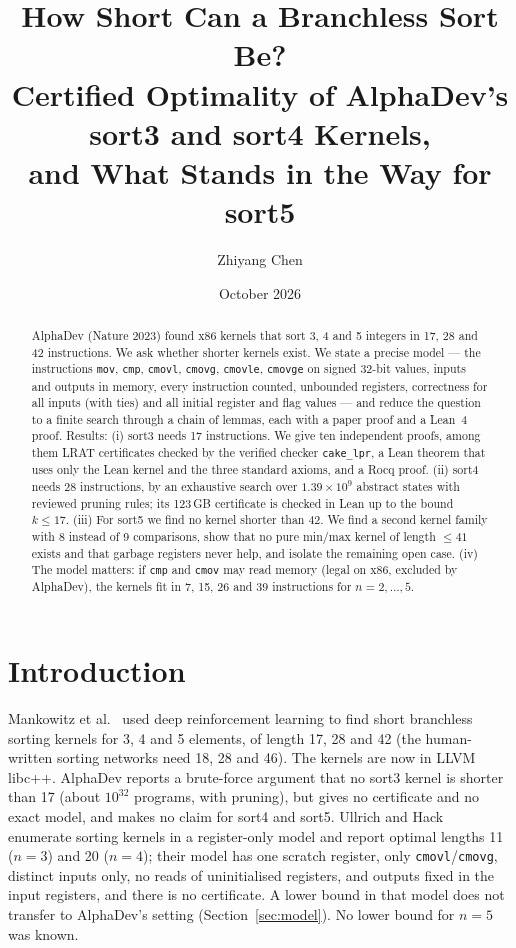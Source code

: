\documentclass[11pt]{article}
\title{How Short Can a Branchless Sort Be?\\ Certified Optimality of AlphaDev's sort3 and sort4 Kernels,\\ and What Stands
in the Way for sort5}
\author{Zhiyang Chen}
\date{October 2026}
\theoremstyle{remark}\newtheorem{remark}[theorem]{Remark}
\begin{document}
\maketitle

\begin{abstract}
AlphaDev (Nature 2023) found x86 kernels that sort 3, 4 and 5 integers in 17, 28 and 42 instructions. We ask whether
shorter kernels exist. We state a precise model --- the instructions \texttt{mov}, \texttt{cmp}, \texttt{cmovl},
\texttt{cmovg}, \texttt{cmovle}, \texttt{cmovge} on signed 32-bit values, inputs and outputs in memory, every instruction
counted, unbounded registers, correctness for all inputs (with ties) and all initial register and flag values --- and reduce
the question to a finite search through a chain of lemmas, each with a paper proof and a Lean~4 proof. Results:
(i) sort3 needs 17 instructions. We give ten independent proofs, among them LRAT certificates checked by the verified checker
\texttt{cake\_lpr}, a Lean theorem that uses only the Lean kernel and the three standard axioms, and a Rocq proof.
(ii) sort4 needs 28 instructions, by an exhaustive search over $1.39\times10^9$ abstract states with reviewed pruning rules;
its 123\,GB certificate is checked in Lean up to the bound $k \le 17$.
(iii) For sort5 we find no kernel shorter than 42. We find a second kernel family with 8 instead of 9 comparisons, show that
no pure min/max kernel of length $\le 41$ exists and that garbage registers never help, and isolate the remaining open case.
(iv) The model matters: if \texttt{cmp} and \texttt{cmov} may read memory (legal on x86, excluded by AlphaDev), the kernels fit
in 7, 15, 26 and 39 instructions for $n = 2, \dots, 5$.
\end{abstract}

\section{Introduction}
Mankowitz et al.~\cite{alphadev} used deep reinforcement learning to find short branchless sorting kernels for 3, 4 and 5
elements, of length 17, 28 and 42 (the human-written sorting networks need 18, 28 and 46). The kernels are now in LLVM libc++.
AlphaDev reports a brute-force argument that no sort3 kernel is shorter than 17 (about $10^{32}$ programs, with pruning), but
gives no certificate and no exact model, and makes no claim for sort4 and sort5. Ullrich and Hack~\cite{ullrich} enumerate
sorting kernels in a register-only model and report optimal lengths 11 ($n=3$) and 20 ($n=4$); their model has one scratch
register, only \texttt{cmovl}/\texttt{cmovg}, distinct inputs only, no reads of uninitialised registers, and outputs fixed in
the input registers, and there is no certificate. A lower bound in that model does not transfer to AlphaDev's setting
(Section~\ref{sec:model}). No lower bound for $n=5$ was known.
\end{document}
